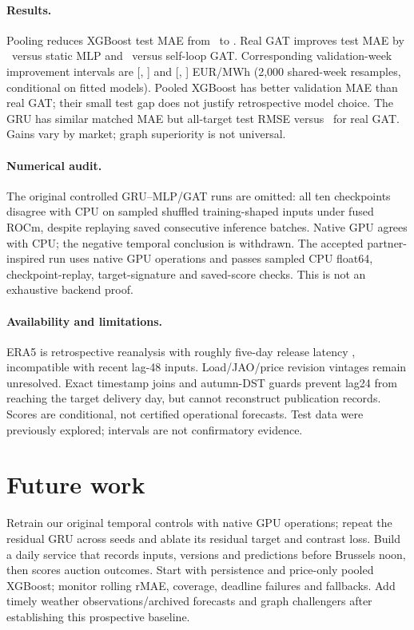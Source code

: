 \documentclass{article}
\begin{document}
\paragraph{Results.}
Pooling reduces XGBoost test MAE from \ZoneTest\ to \PooledTest.
Real GAT improves test MAE by \MlpGatDifference\ versus static MLP and
\SelfGatDifference\ versus self-loop GAT. Corresponding validation-week
improvement intervals are [\MlpCiLower, \MlpCiUpper] and
[\SelfCiLower, \SelfCiUpper] EUR/MWh (2,000 shared-week resamples, conditional
on fitted models). Pooled XGBoost has better validation MAE than real GAT;
their small test gap does not justify retrospective model choice.
The GRU has similar matched MAE but all-target test RMSE \GruRmse{} versus
\GatRmse\ for real GAT. Gains vary by market; graph superiority is not universal.

\paragraph{Numerical audit.}
The original controlled GRU--MLP/GAT runs are omitted: all ten checkpoints
disagree with CPU on sampled shuffled training-shaped inputs under fused ROCm,
despite replaying saved consecutive inference batches. Native GPU agrees with
CPU; the negative temporal conclusion is withdrawn. The accepted partner-inspired
run uses native GPU operations and passes sampled CPU float64, checkpoint-replay,
target-signature and saved-score checks. This is not an exhaustive backend proof.

\paragraph{Availability and limitations.}
ERA5 is retrospective reanalysis with roughly five-day release latency
\cite{era5}, incompatible with recent lag-48 inputs. Load/JAO/price revision
vintages remain unresolved. Exact timestamp joins and autumn-DST guards prevent
lag24 from reaching the target delivery day, but cannot reconstruct publication
records. Scores are conditional, not certified operational forecasts. Test data
were previously explored; intervals are not confirmatory evidence.

\section{Future work}
Retrain our original temporal controls with native GPU operations; repeat the
residual GRU across seeds and ablate its residual target and contrast loss.
Build a daily service that records inputs, versions and predictions before
Brussels noon, then scores auction outcomes. Start with persistence and
price-only pooled XGBoost; monitor rolling rMAE, coverage, deadline failures and
fallbacks. Add timely weather observations/archived forecasts and graph challengers
after establishing this prospective baseline.
\end{document}
